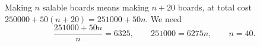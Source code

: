 Making $n$ salable boards means making $n+20$ boards, at total cost $250000+50(n+20)=251000+50n$. We need
\[\dfrac{251000+50n}{n}=6325,\qquad251000=6275n,\qquad n=\boxed{40}.\]
